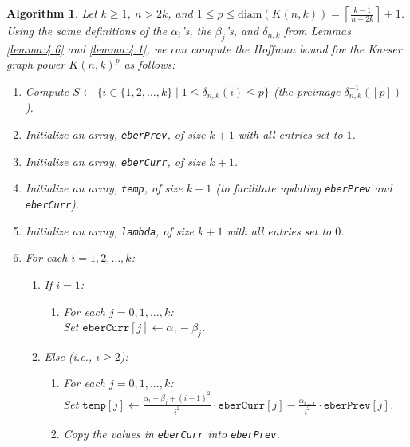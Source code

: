 \documentclass{article}
\numberwithin{equation}{section}
\theoremstyle{plain}
\newtheorem{algo}[theorem]{Algorithm}
\begin{document}
\begin{algo}\label{algo:4.8}
    Let $k \ge 1$, $n > 2k$, and $1 \le p \le \mathrm{diam}(K(n, k)) = \left\lceil\frac{k - 1}{n - 2k}\right\rceil + 1$. Using the same definitions of the $\alpha_i$'s, the $\beta_j$'s, and $\delta_{n,k}$ from Lemmas \ref{lemma:4.6} and \ref{lemma:4.1}, we can compute the Hoffman bound for the Kneser graph power $K(n, k)^p$ as follows:
    {
        \normalfont
        \begin{enumerate}
            \item Compute $S \gets \{i \in \{1, 2, \ldots, k\} \mid 1 \le \delta_{n,k}(i) \le p\}$ (the preimage $\delta_{n,k}^{-1}([p])$).
            \item Initialize an array, \texttt{eberPrev}, of size $k + 1$ with all entries set to $1$.
            \item Initialize an array, \texttt{eberCurr}, of size $k + 1$.
            \item Initialize an array, \texttt{temp}, of size $k + 1$ (to facilitate updating \texttt{eberPrev} and \texttt{eberCurr}).
            \item Initialize an array, \texttt{lambda}, of size $k + 1$ with all entries set to $0$.
            \item For each $i = 1, 2, \ldots, k$:
                \begin{enumerate}
                    \item If $i = 1$:
                        \begin{enumerate}
                            \item For each $j = 0, 1, \ldots, k$:\\
                                \hspace*{\algorithmicindent}Set $\texttt{eberCurr}[j] \gets \alpha_1 - \beta_j$.
                        \end{enumerate}
                    \item Else (i.e., $i \ge 2$):
                        \begin{enumerate}
                            \item For each $j = 0, 1, \ldots, k$:\\
                                \hspace*{\algorithmicindent}Set $\texttt{temp}[j] \gets \frac{\alpha_i - \beta_j + (i - 1)^2}{i^2} \cdot \texttt{eberCurr}[j] - \frac{\alpha_{i - 1}}{i^2} \cdot \texttt{eberPrev}[j]$.
                            \item Copy the values in \texttt{eberCurr} into \texttt{eberPrev}.

\end{enumerate}
\end{enumerate}
\end{enumerate}}
\end{algo}
\end{document}
